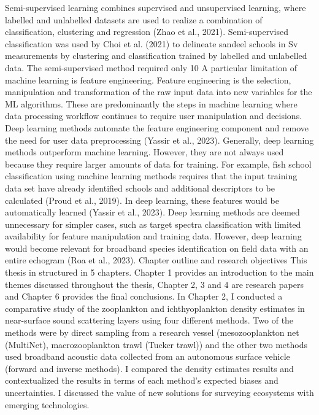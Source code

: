 Semi-supervised learning combines supervised and unsupervised learning, where labelled and unlabelled datasets are used to realize a combination of classification, clustering and regression (Zhao et al., 2021). Semi-supervised classification was used by Choi et al. (2021) to delineate sandeel schools in Sv measurements by clustering and classification trained by labelled and unlabelled data. The semi-supervised method required only 10%
A particular limitation of machine learning is feature engineering. Feature engineering is the selection, manipulation and transformation of the raw input data into new variables for the ML algorithms. These are predominantly the steps in machine learning where data processing workflow continues to require user manipulation and decisions. Deep learning methods automate the feature engineering component and remove the need for user data preprocessing (Yassir et al., 2023). Generally, deep learning methods outperform machine learning. However, they are not always used because they require larger amounts of data for training. For example, fish school classification using machine learning methods requires that the input training data set have already identified schools and additional descriptors to be calculated (Proud et al., 2019). In deep learning, these features would be automatically learned (Yassir et al., 2023). Deep learning methods are deemed unnecessary for simpler cases, such as target spectra classification with limited availability for feature manipulation and training data. However, deep learning would become relevant for broadband species identification on field data with an entire echogram (Roa et al., 2023).
Chapter outline and research objectives
This thesis in structured in 5 chapters. Chapter 1 provides an introduction to the main themes discussed throughout the thesis, Chapter 2, 3 and 4 are research papers and Chapter 6 provides the final conclusions.
In Chapter 2, I conducted a comparative study of the zooplankton and ichthyoplankton density estimates in near-surface sound scattering layers using four different methods. Two of the methods were by direct sampling from a research vessel (mesozooplankton net (MultiNet), macrozooplankton trawl (Tucker trawl)) and the other two methods used broadband acoustic data collected from an autonomous surface vehicle (forward and inverse methods). I compared the density estimates results and contextualized the results in terms of each method's expected biases and uncertainties. I discussed the value of new solutions for surveying ecosystems with emerging technologies.
